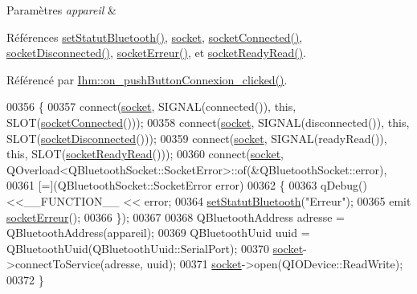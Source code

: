 \begin{DoxyParams}{Paramètres}
{\em appareil} & \\
\hline
\end{DoxyParams}


Références \hyperlink{class_transmission_a0680d6aab9c17d11e90566c359187ebc}{set\+Statut\+Bluetooth()}, \hyperlink{class_transmission_a0b579c9da71d4b19f0504241ffbfae21}{socket}, \hyperlink{class_transmission_ad231163c435936cc69149dd03aaaf473}{socket\+Connected()}, \hyperlink{class_transmission_a5b02dec98a34f14b341adf40cf520bdf}{socket\+Disconnected()}, \hyperlink{class_transmission_ad42d923341b19d450d27c7659ea51a58}{socket\+Erreur()}, et \hyperlink{class_transmission_a3beab187cc2056a8f34bc6643fdc0e26}{socket\+Ready\+Read()}.



Référencé par \hyperlink{class_ihm_abf61dda1820e5632485de93983c40196}{Ihm\+::on\+\_\+push\+Button\+Connexion\+\_\+clicked()}.


\begin{DoxyCode}
00356 \{
00357     connect(\hyperlink{class_transmission_a0b579c9da71d4b19f0504241ffbfae21}{socket}, SIGNAL(connected()), \textcolor{keyword}{this}, SLOT(\hyperlink{class_transmission_ad231163c435936cc69149dd03aaaf473}{socketConnected}()));
00358     connect(\hyperlink{class_transmission_a0b579c9da71d4b19f0504241ffbfae21}{socket}, SIGNAL(disconnected()), \textcolor{keyword}{this}, SLOT(\hyperlink{class_transmission_a5b02dec98a34f14b341adf40cf520bdf}{socketDisconnected}()));
00359     connect(\hyperlink{class_transmission_a0b579c9da71d4b19f0504241ffbfae21}{socket}, SIGNAL(readyRead()), \textcolor{keyword}{this}, SLOT(\hyperlink{class_transmission_a3beab187cc2056a8f34bc6643fdc0e26}{socketReadyRead}()));
00360     connect(\hyperlink{class_transmission_a0b579c9da71d4b19f0504241ffbfae21}{socket}, QOverload<QBluetoothSocket::SocketError>::of(&QBluetoothSocket::error),
00361         [=](QBluetoothSocket::SocketError error)
00362     \{
00363         qDebug() <<\_\_FUNCTION\_\_ << error;
00364         \hyperlink{class_transmission_a0680d6aab9c17d11e90566c359187ebc}{setStatutBluetooth}(\textcolor{stringliteral}{"Erreur"});
00365         emit \hyperlink{class_transmission_ad42d923341b19d450d27c7659ea51a58}{socketErreur}();
00366     \});
00367 
00368     QBluetoothAddress adresse = QBluetoothAddress(appareil);
00369     QBluetoothUuid uuid = QBluetoothUuid(QBluetoothUuid::SerialPort);
00370     \hyperlink{class_transmission_a0b579c9da71d4b19f0504241ffbfae21}{socket}->connectToService(adresse, uuid);
00371     \hyperlink{class_transmission_a0b579c9da71d4b19f0504241ffbfae21}{socket}->open(QIODevice::ReadWrite);
00372 \}
\end{DoxyCode}
